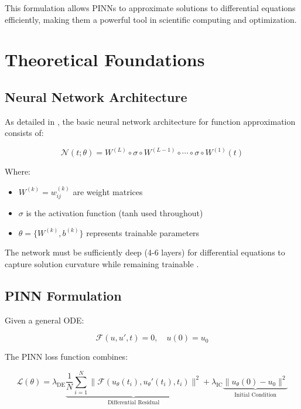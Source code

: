 \documentclass{article}
\begin{document}
\noindent This formulation allows PINNs to approximate solutions to differential equations efficiently, making them a powerful tool in scientific computing and optimization.
\newpage
\section{Theoretical Foundations}

\subsection{Neural Network Architecture}
As detailed in \cite{MATH2030}, the basic neural network architecture for function approximation consists of:

\begin{equation}
\mathcal{N}(t; \theta) = W^{(L)} \circ \sigma \circ W^{(L-1)} \circ \cdots \circ \sigma \circ W^{(1)}(t)
\end{equation}

Where:
\begin{itemize}
\item $W^{(k)} = w_{ij}^{(k)}$ are weight matrices
\item $\sigma$ is the activation function (tanh used throughout)
\item $\theta = \{W^{(k)}, b^{(k)}\}$ represents trainable parameters
\end{itemize}

The network must be sufficiently deep (4-6 layers) for differential equations to capture solution curvature while remaining trainable \cite{module13030_2}.

\subsection{PINN Formulation}
Given a general ODE:

\begin{equation}
\mathcal{F}(u, u', t) = 0,\quad u(0) = u_0
\end{equation}

The PINN loss function combines:

\begin{equation}
\mathcal{L}(\theta) = \lambda_{\text{DE}} \underbrace{\frac{1}{N}\sum_{i=1}^N \|\mathcal{F}(u_\theta(t_i), u_\theta'(t_i), t_i)\|^2}_{\text{Differential Residual}} + \lambda_{\text{IC}} \underbrace{\|u_\theta(0) - u_0\|^2}_{\text{Initial Condition}}
\end{equation}
\end{document}
